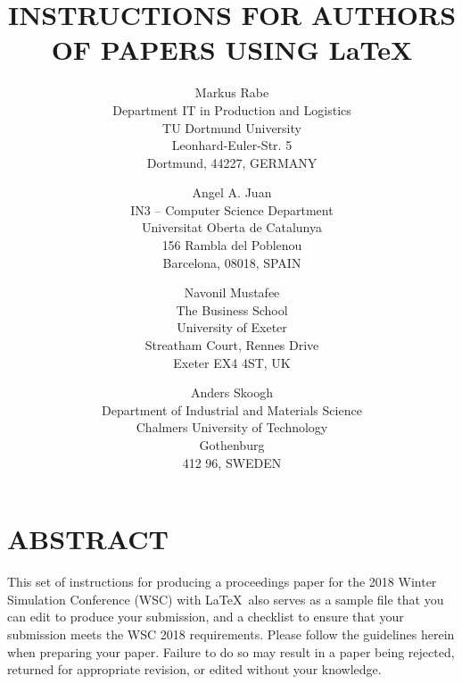 \documentclass{wscpaperproc}
\theoremstyle{wsc}
\begin{document}
%
%

\title{INSTRUCTIONS FOR AUTHORS OF PAPERS USING \LaTeX}

\author{Markus Rabe\\ [12pt]
Department IT in Production and Logistics \\
TU Dortmund University\\
Leonhard-Euler-Str. 5\\
Dortmund, 44227, GERMANY\\
\and
Angel A. Juan\\[12pt]
IN3 -- Computer Science Department\\
Universitat Oberta de Catalunya\\
156 Rambla del Poblenou\\
Barcelona, 08018, SPAIN\\
\and
Navonil Mustafee\\ [12pt]
The Business School\\
University of Exeter\\
Streatham Court, Rennes Drive\\
Exeter EX4 4ST, UK\\
\and
Anders Skoogh\\ [12pt]
Department of Industrial and Materials Science\\
Chalmers University of Technology\\
Gothenburg\\
412 96, SWEDEN
}






\maketitle

\section*{ABSTRACT}
This set of instructions for producing a proceedings paper for the 2018 Winter Simulation Conference (WSC) with \LaTeX\ also serves as a sample file that you can edit to produce your submission, and a checklist to ensure that your submission meets the WSC 2018 requirements. Please follow the guidelines herein when preparing your paper. Failure to do so may result in a paper being rejected, returned for appropriate revision, or edited without your knowledge.
\end{document}
